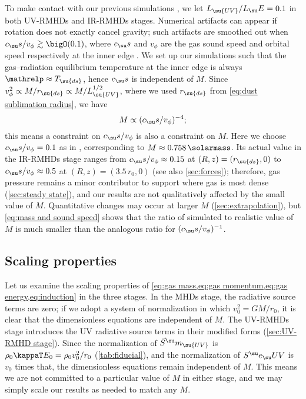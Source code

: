 \documentclass[twocolumn]{article}
\newcommand*\uvrmhd{\ac{UV}\protect\nobreakdash-\acp{RMHD}}
\newcommand*\irrmhd{\ac{IR}\protect\nobreakdash-\acp{RMHD}}
\newcommand*\momsrc[1]{\vec S^\su m_\su{#1}}
\begin{document}
To make contact with our previous simulations ,
we let $L_\su{UV}/L_\su E=0.1$ in both \uvrmhd{} and \irrmhd{} stages.
Numerical artifacts can appear if rotation does not exactly cancel gravity;
such artifacts are smoothed out when $c_\su s/v_\phi\gtrsim\bigO(0.1)$, where
$c_\su s$ and $v_\phi$ are the gas sound speed and orbital speed respectively
at the inner edge . We set up our simulations
such that the gas--radiation equilibrium temperature at the inner edge is
always $\mathrelp\approx T_\su{ds}$, hence $c_\su s$ is independent of $M$.
Since $v_\phi^2\propto M/r_\su{ds}\propto M/L_\su{UV}^{1/2}$, where we used
$r_\su{ds}$ from \cref{eq:dust sublimation radius}, we have
\begin{equation}\label{eq:mass and sound speed}
M\propto(c_\su s/v_\phi)^{-4};
\end{equation}
this means a constraint on $c_\su s/v_\phi$ is also a constraint on $M$. Here
we choose $c_\su s/v_\phi=0.1$ as in ,
corresponding to $M\approx\SI{0.758}{\solarmass}$. Its actual value in the
\irrmhd{} stage ranges from $c_\su s/v_\phi\approx0.15$ at
$(R,z)=(r_\su{ds},0)$ to $c_\su s/v_\phi\approx0.5$ at $(R,z)=(3.5\,r_0,0)$
(see also \cref{sec:forces}); therefore, gas pressure remains a minor
contributor to support where gas is most dense (\cref{sec:steady state}), and
our results are not qualitatively affected by the small value of $M$.
Quantitative changes may occur at larger $M$ (\cref{sec:extrapolation}), but
\cref{eq:mass and sound speed} shows that the ratio of simulated to realistic
value of $M$ is much smaller than the analogous ratio for $(c_\su
s/v_\phi)^{-1}$.

\subsection{Scaling properties}

Let us examine the scaling properties of \cref{eq:gas mass,eq:gas
momentum,eq:gas energy,eq:induction} in the three stages. In the \acp{MHD}
stage, the radiative source terms are zero; if we adopt a system of
normalization in which $v_0^2=GM/r_0$, it is clear that the dimensionless
equations are independent of $M$. The \uvrmhd{} stage introduces the \ac{UV}
radiative source terms in their modified forms (\cref{sec:UV-RMHD stage}).
Since the normalization of $\momsrc{UV}$ is $\rho_0\kappaT E_0=\rho_0v_0^2/r_0$
(\cref{tab:fiducial}), and the normalization of $\ergsrc{UV}$ is $v_0$ times
that, the dimensionless equations remain independent of $M$. This means we are
not committed to a particular value of $M$ in either stage, and we may simply
scale our results as needed to match any $M$.
\end{document}
